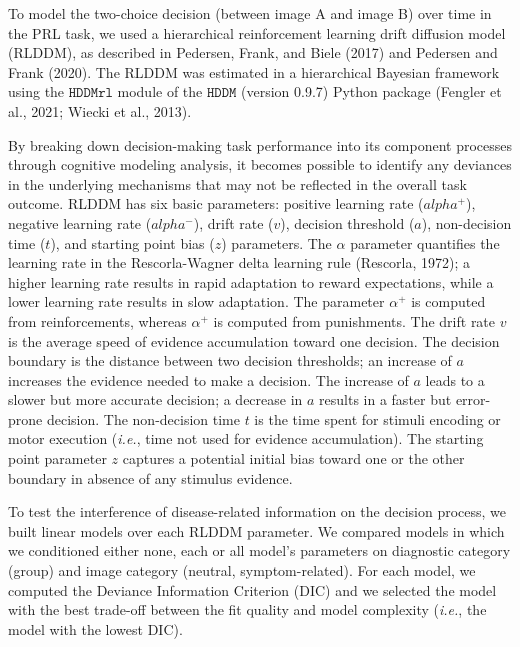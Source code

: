 \documentclass[
  man,floatsintext]{apa6}
\begin{document}
To model the two-choice decision (between image A and image B) over time in the PRL task, we used a hierarchical reinforcement learning drift diffusion model (RLDDM), as described in Pedersen, Frank, and Biele (2017) and Pedersen and Frank (2020). The RLDDM was estimated in a hierarchical Bayesian framework using the \(\texttt{HDDMrl}\) module of the \(\texttt{HDDM}\) (version 0.9.7) Python package (Fengler et al., 2021; Wiecki et al., 2013).

By breaking down decision-making task performance into its component processes through cognitive modeling analysis, it becomes possible to identify any deviances in the underlying mechanisms that may not be reflected in the overall task outcome. RLDDM has six basic parameters: positive learning rate (\(alpha^+\)), negative learning rate (\(alpha^-\)), drift rate (\(v\)), decision threshold (\(a\)), non-decision time (\(t\)), and starting point bias (\(z\)) parameters. The \(\alpha\) parameter quantifies the learning rate in the Rescorla-Wagner delta learning rule (Rescorla, 1972); a higher learning rate results in rapid adaptation to reward expectations, while a lower learning rate results in slow adaptation. The parameter \(\alpha^+\) is computed from reinforcements, whereas \(\alpha^+\) is computed from punishments. The drift rate \(v\) is the average speed of evidence accumulation toward one decision. The decision boundary is the distance between two decision thresholds; an increase of \(a\) increases the evidence needed to make a decision. The increase of \(a\) leads to a slower but more accurate decision; a decrease in \(a\) results in a faster but error-prone decision. The non-decision time \(t\) is the time spent for stimuli encoding or motor execution (\emph{i.e.}, time not used for evidence accumulation). The starting point parameter \(z\) captures a potential initial bias toward one or the other boundary in absence of any stimulus evidence.

To test the interference of disease-related information on the decision process, we built linear models over each RLDDM parameter. We compared models in which we conditioned either none, each or all model's parameters on diagnostic category (group) and image category (neutral, symptom-related). For each model, we computed the Deviance Information Criterion (DIC) and we selected the model with the best trade-off between the fit quality and model complexity (\emph{i.e.}, the model with the lowest DIC).
\end{document}
